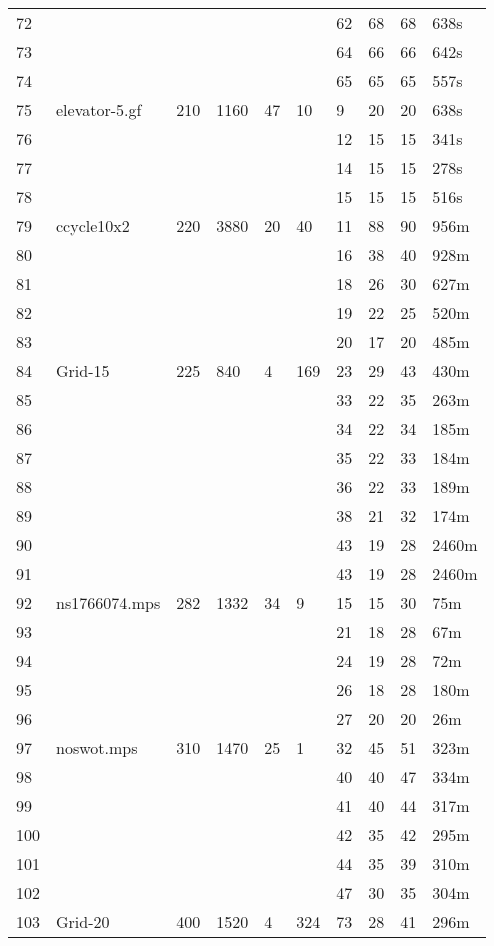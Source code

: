 \documentclass{article}
\begin{document}
\begin{longtable}{|l |l |l |l |l |l |l |l |l |l |}
72&&&&&&62&68&68&638s\\
73&&&&&&64&66&66&642s\\
74&&&&&&65&65&65&557s\\
75&elevator-5.gf&210&1160&47&10&9&20&20&638s\\
76&&&&&&12&15&15&341s\\
77&&&&&&14&15&15&278s\\
78&&&&&&15&15&15&516s\\
79&ccycle10x2&220&3880&20&40&11&88&90&956m\\
80&&&&&&16&38&40&928m\\
81&&&&&&18&26&30&627m\\
82&&&&&&19&22&25&520m\\
83&&&&&&20&17&20&485m\\
84&Grid-15&225&840&4&169&23&29&43&430m\\
85&&&&&&33&22&35&263m\\
86&&&&&&34&22&34&185m\\
87&&&&&&35&22&33&184m\\
88&&&&&&36&22&33&189m\\
89&&&&&&38&21&32&174m\\
90&&&&&&43&19&28&2460m\\
91&&&&&&43&19&28&2460m\\
92&ns1766074.mps&282&1332&34&9&15&15&30&75m\\
93&&&&&&21&18&28&67m\\
94&&&&&&24&19&28&72m\\
95&&&&&&26&18&28&180m\\
96&&&&&&27&20&20&26m\\
97&noswot.mps&310&1470&25&1&32&45&51&323m\\
98&&&&&&40&40&47&334m\\
99&&&&&&41&40&44&317m\\
100&&&&&&42&35&42&295m\\
101&&&&&&44&35&39&310m\\
102&&&&&&47&30&35&304m\\
103&Grid-20&400&1520&4&324&73&28&41&296m\\
\hline
\end{longtable}
\end{document}
